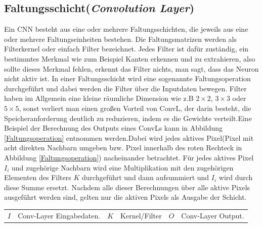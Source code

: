 \documentclass[12pt,a4paper]{scrartcl}
\numberwithin{equation}{section}
\begin{document}
\subsection{Faltungsschicht(\textit{Convolution Layer})}
Ein \ac{CNN} besteht aus eine oder mehrere Faltungsschichten, die jeweils aus eine oder mehrere Faltungseinheiten bestehen. Die Faltungsmatrizen werden als Filterkernel oder einfach Filter bezeichnet. Jedes Filter ist dafür zuständig, ein bestimmtes Merkmal wie zum Beispiel Kanten erkennen und zu extrahieren, also sollte dieses Merkmal fehlen, erkennt das Filter nichts, man sagt, dass das Neuron nicht aktiv ist. In einer Faltungsschicht wird eine sogenannte Faltungsoperation durchgeführt und dabei werden die Filter über die Inputdaten bewegen. Filter haben im Allgemein eine kleine räumliche Dimension wie z.B $ 2\times 2 $, $3 \times3 $  oder  $5 \times 5$, sonst verliert man einen großen Vorteil von \ac{ConvL}, der darin besteht, die Speicheranforderung deutlich zu reduzieren, indem es die Gewichte verteilt.Eine Beispiel der Berechnung des Outputs eines \ac{ConvL}s kann in Abbildung \ref{Faltungsoperation} entnommen werden.Dabei wird jedes aktives Pixel(Pixel mit acht direkten Nachbarn umgeben bzw. Pixel innerhalb des roten Rechteck in Abbildung \ref{Faltungsoperation}) nacheinander betrachtet. Für jedes aktives Pixel $ I_i $ und zugehörige Nachbarn wird eine Multiplikation mit den zugehörigen Elementen des Filters $ K $ durchgeführt und dann aufsummiert und $ I_i $ wird durch diese Summe ersetzt. Nachdem alle dieser Berechnungen über alle aktive Pixels ausgeführt werden sind, gelten nur die aktiven Pixels als Ausgabe der Schicht.

\begin{center}
	\begin{tabular}{r@{: }l r@{: }l r@{: }l}
		$I$ & Conv-Layer Eingabedaten. & $K$ & Kernel/Filter& $ O $ &Conv-Layer Output.
	\end{tabular}
\end{center}
\end{document}
